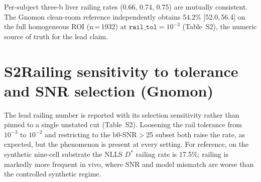 \documentclass[11pt]{article}
\newcommand{\Dstar}{\ensuremath{D^{*}}}
\begin{document}
\begin{table}[htbp]
\centering
\caption{Per-cohort \Dstar{} railing (Sextant; $\texttt{rail\_tol}$ tight bounds; 95\%
bootstrap CI, 5000 resamples). ``Analyzed'' is the bootstrapped voxel count (liver
cohorts subsampled from millions of high-SNR voxels). Pre-registered replication
threshold: point $\ge 0.30$, CI lower $\ge 0.20$.}
\small
{}
\par\vspace{0.3em}
{\footnotesize Per-subject three-b liver railing rates (0.66, 0.74, 0.75) are mutually
consistent. The Gnomon clean-room reference independently obtains 54.2\% [52.0,\,56.4] on
the full homogeneous ROI (n\,=\,1932) at $\texttt{rail\_tol}=10^{-3}$ (Table~S2), the
numeric source of truth for the lead claim.}
\end{table}

\section*{S2\quad Railing sensitivity to tolerance and SNR selection (Gnomon)}

The lead railing number is reported with its selection sensitivity rather than pinned to
a single unstated cut (Table~S2). Loosening the rail tolerance from $10^{-3}$ to
$10^{-2}$ and restricting to the b0-SNR$>$25 subset both raise the rate, as expected, but
the phenomenon is present at every setting. For reference, on the synthetic nine-cell
substrate the NLLS \Dstar{} railing rate is 17.5\%; railing is markedly more frequent in
vivo, where SNR and model mismatch are worse than the controlled synthetic regime.
\end{document}
